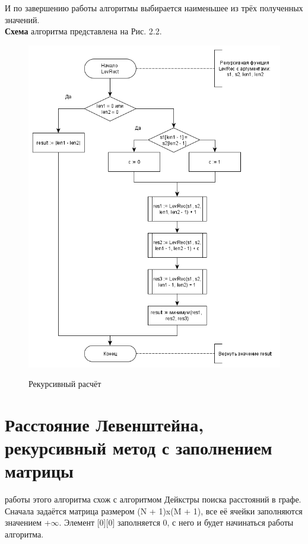 \documentclass[12pt]{report}
\begin{document}
И по завершению работы алгоритмы выбирается наименьшее из трёх полученных значений. \\

\textbf{Схема} алгоритма представлена на Рис. 2.2.

\begin{figure}[h]
	\begin{center}
		{\includegraphics[scale = 0.75]{LevRec}}
		\caption{Рекурсивный расчёт}
	\end{center}
\end{figure}

\section{Расстояние Левенштейна, рекурсивный метод с заполнением матрицы}
 работы этого алгоритма схож с алгоритмом Дейкстры поиска расстояний в графе. \\

Сначала задаётся матрица размером (N + 1)x(M + 1), все её ячейки заполняются значением +{$\infty$}. Элемент [0][0] заполняется 0, с него и будет начинаться работы алгоритма.\\
\end{document}
